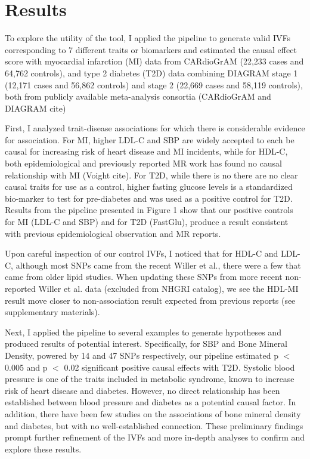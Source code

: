 \section{Results}
To explore the utility of the tool, I applied the pipeline to generate valid IVFs corresponding to 7 different
traits or biomarkers and estimated the causal effect score with myocardial infarction (MI) data 
from CARdioGrAM (22,233 cases and 64,762 controls), and type 2 diabetes (T2D) data combining DIAGRAM stage 1 (12,171 
cases and 56,862 controls) and stage 2 (22,669 cases and 58,119 controls), both from publicly available meta-analysis consortia (CARdioGrAM and DIAGRAM cite)

First, I analyzed trait-disease associations for which there is considerable evidence for association. For MI, higher LDL-C and SBP are widely accepted to each be causal for increasing risk of heart disease and MI incidents, while for HDL-C, both epidemiological and previously reported MR work has found no causal relationship with MI (Voight cite). For T2D, while there is no there are no clear causal traits for use as a control, higher fasting glucose levels is a standardized bio-marker to test for pre-diabetes and was used as a positive control for T2D. Results from the pipeline presented in Figure 1 show that our positive controls for MI (LDL-C and 
SBP) and for T2D (FastGlu), produce a result consistent with previous epidemiological observation and MR reports. 

Upon careful inspection of our control IVFs, I noticed that for HDL-C and LDL-C, although most SNPs came from the recent Willer et al., there were a few that came from older lipid studies. When updating these SNPs from more recent non-reported Willer et al. data (excluded from NHGRI catalog), we see the HDL-MI result move closer to non-association result expected from previous reports (see supplementary materials).

Next, I applied the pipeline to several examples to generate hypotheses and produced results of potential interest. Specifically, for SBP and Bone Mineral Density, powered by 14 and 47 SNPs respectively, our pipeline estimated p $<$ 0.005 and p $<$ 0.02 significant positive causal effects with T2D. Systolic blood pressure is one of the traits included in metabolic syndrome, known to increase risk of heart disease and diabetes. However, no direct relationship has been established between blood pressure and diabetes as a potential causal factor. In addition, there have been few studies on the associations of bone mineral density and diabetes, but with no well-established connection. These preliminary findings prompt further refinement of the IVFs and more in-depth analyses to confirm and explore these results.